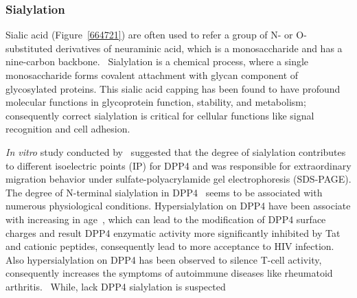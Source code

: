 \subsubsection {Sialylation}
Sialic acid (Figure~\ref{664721}) are often used to refer a group of N- or O-substituted derivatives of neuraminic acid, which is a monosaccharide and has a nine-carbon backbone.~\cite{Vocadlo_2009} Sialylation is a chemical process, where a single monosaccharide forms covalent attachment with glycan component of glycosylated proteins. This sialic acid capping has been found to have profound molecular functions in glycoprotein function, stability, and metabolism; consequently correct sialylation is critical for cellular functions like signal recognition and cell adhesion.~\cite{Bhide_2016}
\par 
\textit{In vitro} study conducted by~\citet{Schmauser1999} suggested that the degree of sialylation contributes to different isoelectric points (IP) for DPP4 and was responsible for extraordinary migration behavior under sulfate-polyacrylamide gel electrophoresis (SDS-PAGE). 
The degree of N-terminal sialylation in DPP4~\cite{Stehling_1999} seems to be associated with numerous physiological conditions. Hypersialylation on DPP4 have been associate with increasing in age~\cite{SMITH_1998}, which can lead to the modification of DPP4 surface charges and result DPP4 enzymatic activity more significantly inhibited by Tat and cationic peptides, consequently lead to more acceptance to HIV infection.~\cite{SMITH_1998} Also hypersialylation on DPP4 has been observed to silence T-cell activity, consequently increases the symptoms of autoimmune diseases like rheumatoid arthritis.~\cite{Cuchacovich2001}  
While, lack DPP4 sialylation is suspected 
\cite{K_hne_1996} 
